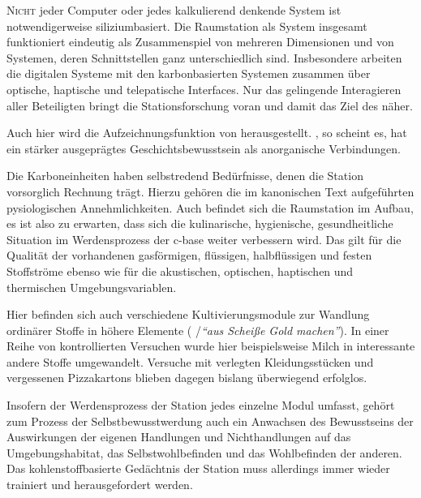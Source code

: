 \begin{newstuff}
    \lettrine{N}{icht} jeder Computer oder jedes kalkulierend denkende System ist notwendigerweise siliziumbasiert. Die Raumstation als System insgesamt funktioniert eindeutig als Zusammenspiel von mehreren Dimensionen und von Systemen, deren Schnittstellen ganz unterschiedlich sind. Insbesondere arbeiten die digitalen Systeme mit den karbonbasierten Systemen zusammen über optische, haptische und telepatische Interfaces. 
    Nur das gelingende Interagieren aller Beteiligten bringt die Stationsforschung voran und damit das Ziel des  näher.


    Auch hier wird die Aufzeichnungsfunktion von  herausgestellt. , so scheint es, hat ein stärker ausgeprägtes Geschichtsbewusstsein als anorganische Verbindungen.
    
    Die Karboneinheiten haben selbstredend Bedürfnisse, denen die Station vorsorglich Rechnung trägt.
    Hierzu gehören die im kanonischen Text aufgeführten pysiologischen Annehmlichkeiten. Auch befindet sich die  Raumstation im Aufbau, es ist also zu erwarten, dass sich die kulinarische, hygienische, gesundheitliche Situation im Werdensprozess der c-base weiter verbessern wird. Das gilt für die Qualität der vorhandenen gasförmigen, flüssigen, halbflüssigen und festen Stoffströme ebenso wie für die akustischen, optischen, haptischen und thermischen Umgebungsvariablen. \cite{celestialhomecareomnibus}

    Hier befinden sich auch verschiedene Kultivierungsmodule zur Wandlung ordinärer Stoffe in höhere Elemente ( /\emph{"`aus Scheiße Gold machen"'}). In einer Reihe von kontrollierten Versuchen wurde hier beispielsweise Milch in interessante andere Stoffe umgewandelt. Versuche mit verlegten Kleidungsstücken und vergessenen \mbox{Pizza}\-kartons blieben dagegen bislang überwiegend erfolglos.
  
    Insofern der Werdensprozess der Station jedes einzelne Modul umfasst, gehört zum Prozess der Selbstbewusstwerdung auch ein Anwachsen des Bewusstseins der Auswirkungen der eigenen Handlungen und Nichthandlungen auf das Umgebungshabitat, das Selbstwohlbefinden und das Wohlbefinden der anderen. Das kohlenstoffbasierte Gedächtnis der Station muss allerdings immer wieder trainiert und herausgefordert werden.


\end{newstuff}
